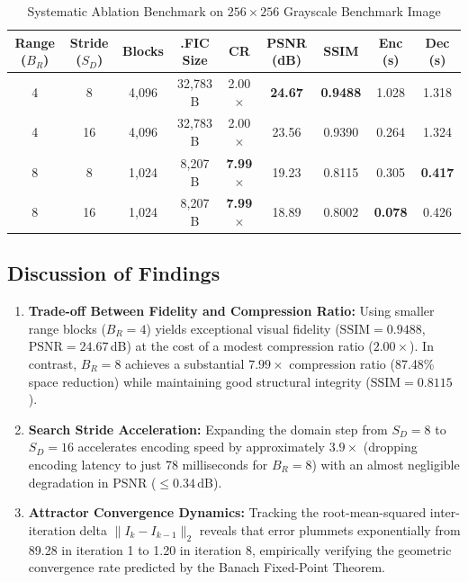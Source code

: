 \documentclass[11pt,a4paper]{article}
\begin{document}
\begin{table}[htbp]
\centering
\caption{Systematic Ablation Benchmark on $256 \times 256$ Grayscale Benchmark Image}
\label{tab:ablation}
\vspace{0.5em}
\small
\begin{tabularx}{\textwidth}{ccccccccc}
\toprule
\textbf{Range ($B_R$)} & \textbf{Stride ($S_D$)} & \textbf{Blocks} & \textbf{.FIC Size} & \textbf{CR} & \textbf{PSNR (dB)} & \textbf{SSIM} & \textbf{Enc (s)} & \textbf{Dec (s)} \\
\midrule
4 & 8 & 4,096 & 32,783 B & 2.00$\times$ & \textbf{24.67} & \textbf{0.9488} & 1.028 & 1.318 \\
4 & 16 & 4,096 & 32,783 B & 2.00$\times$ & 23.56 & 0.9390 & 0.264 & 1.324 \\
8 & 8 & 1,024 & 8,207 B & \textbf{7.99$\times$} & 19.23 & 0.8115 & 0.305 & \textbf{0.417} \\
8 & 16 & 1,024 & 8,207 B & \textbf{7.99$\times$} & 18.89 & 0.8002 & \textbf{0.078} & 0.426 \\
\bottomrule
\end{tabularx}
\end{table}

\subsection{Discussion of Findings}
\begin{enumerate}
    \item \textbf{Trade-off Between Fidelity and Compression Ratio:} Using smaller range blocks ($B_R = 4$) yields exceptional visual fidelity ($\text{SSIM} = 0.9488$, $\text{PSNR} = 24.67$\,dB) at the cost of a modest compression ratio ($2.00\times$). In contrast, $B_R = 8$ achieves a substantial $7.99\times$ compression ratio (87.48\% space reduction) while maintaining good structural integrity ($\text{SSIM} = 0.8115$).
    \item \textbf{Search Stride Acceleration:} Expanding the domain step from $S_D = 8$ to $S_D = 16$ accelerates encoding speed by approximately $3.9\times$ (dropping encoding latency to just 78 milliseconds for $B_R = 8$) with an almost negligible degradation in PSNR ($\le 0.34$\,dB).
    \item \textbf{Attractor Convergence Dynamics:} Tracking the root-mean-squared inter-iteration delta $\|I_k - I_{k-1}\|_2$ reveals that error plummets exponentially from 89.28 in iteration 1 to 1.20 in iteration 8, empirically verifying the geometric convergence rate predicted by the Banach Fixed-Point Theorem.
\end{enumerate}
\end{document}
